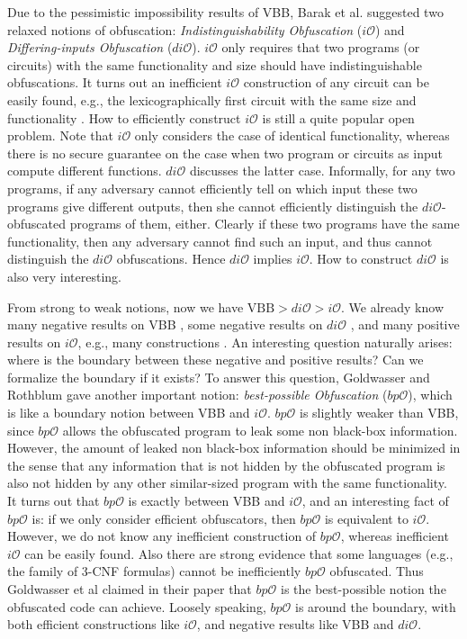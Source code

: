 \documentclass[12pt]{article}
\newcommand{\io}{i\mathcal{O}}
\newcommand{\dio}{di\mathcal{O}}
\newcommand{\bpo}{bp\mathcal{O}}
\theoremstyle{definition}
\begin{document}
Due to the pessimistic impossibility results of VBB, Barak et al. \cite{barak2001possibility} suggested two relaxed notions of obfuscation: \emph{Indistinguishability Obfuscation} ($\io$) and \emph{Differing-inputs Obfuscation} ($\dio$). $\io$ only requires that two programs (or circuits) with the same functionality and size should have indistinguishable obfuscations. It turns out an inefficient $\io$ construction of any circuit can be easily found, e.g., the lexicographically first circuit with the same size and functionality \cite{barak2001possibility}. How to efficiently construct $\io$ is still a quite popular open problem. Note that $\io$ only considers the case of identical functionality, whereas there is no secure guarantee on the case when two program or circuits as input compute different functions. $\dio$ discusses the latter case. Informally, for any two programs, if any adversary cannot efficiently tell on which input these two programs give different outputs, then she cannot efficiently distinguish the $\dio$-obfuscated programs of them, either. Clearly if these two programs have the same functionality, then any adversary cannot find such an input, and thus cannot distinguish the $\dio$ obfuscations. Hence $\dio$ implies $\io$. How to construct $\dio$ is also very interesting.

From strong to weak notions, now we have $\mathrm{VBB} > di\mathcal{O} > i\mathcal{O}$. We already know many negative results on VBB \cite{barak2001possibility,goldwasser2005impossibility,bitansky2014impossibility}, some negative results on $\dio$ \cite{garg2014implausibility}, and many positive results on $\io$, e.g., many constructions \cite{garg2013candidate,pass2014,gentry2015,bitansky2015,koppula2015}. An interesting question naturally arises: where is the boundary between these negative and positive results? Can we formalize the boundary if it exists? To answer this question, Goldwasser and Rothblum \cite{goldwasser2007best} gave another important notion: \emph{best-possible Obfuscation} ($\bpo$), which is like a boundary notion between VBB and $\io$. $\bpo$ is slightly weaker than VBB, since $\bpo$ allows the obfuscated program to leak some non black-box information. However, the amount of leaked non black-box information should be minimized in the sense that any information that is not hidden by the obfuscated program is also not hidden by any other similar-sized program with the same functionality. It turns out that $\bpo$ is exactly between VBB and $\io$, and an interesting fact of $\bpo$ is: if we only consider efficient obfuscators, then $\bpo$ is equivalent to $\io$. However, we do not know any inefficient construction of $\bpo$, whereas inefficient $\io$ can be easily found. Also there are strong evidence that some languages (e.g., the family of 3-CNF formulas) cannot be inefficiently $\bpo$ obfuscated. Thus Goldwasser et al claimed in their paper \cite{goldwasser2007best} that $\bpo$ is the best-possible notion the obfuscated code can achieve. Loosely speaking, $\bpo$ is around the boundary, with both efficient constructions like $\io$, and negative results like VBB and $\dio$.
\end{document}
